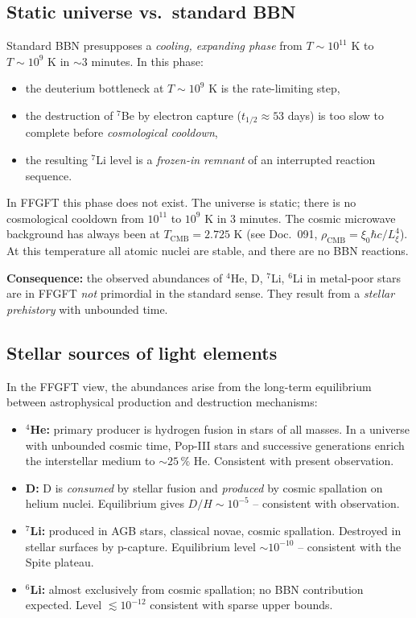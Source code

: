 \subsection{Static universe vs.\ standard BBN}

Standard BBN presupposes a \emph{cooling, expanding phase} from
$T \sim 10^{11}$ K to $T \sim 10^{9}$ K in $\sim 3$ minutes. In this
phase:
\begin{itemize}[leftmargin=2em,itemsep=2pt,topsep=2pt]
  \item the deuterium bottleneck at $T \sim 10^{9}$ K is the
        rate-limiting step,
  \item the destruction of $^7$Be by electron capture
        ($t_{1/2} \approx 53$ days) is too slow to complete before
        \emph{cosmological cooldown},
  \item the resulting $^7$Li level is a \emph{frozen-in remnant} of
        an interrupted reaction sequence.
\end{itemize}

In FFGFT this phase does not exist. The universe is static; there is
no cosmological cooldown from $10^{11}$ to $10^{9}$ K in 3 minutes.
The cosmic microwave background has always been at $T_\text{CMB} =
2.725$ K (see Doc.~091, $\rho_\text{CMB} = \xi_0 \hbar c / L_\xi^4$).
At this temperature all atomic nuclei are stable, and there are no
BBN reactions.

\textbf{Consequence:} the observed abundances of $^4$He, D, $^7$Li,
$^6$Li in metal-poor stars are in FFGFT \emph{not} primordial in the
standard sense. They result from a \emph{stellar prehistory} with
unbounded time.

\subsection{Stellar sources of light elements}

In the FFGFT view, the abundances arise from the long-term
equilibrium between astrophysical production and destruction
mechanisms:

\begin{itemize}[leftmargin=2em,itemsep=2pt,topsep=2pt]
  \item \textbf{$^4$He:} primary producer is hydrogen fusion in stars
        of all masses. In a universe with unbounded cosmic time,
        Pop-III stars and successive generations enrich the
        interstellar medium to $\sim 25\,\%$ He. Consistent with
        present observation.
  \item \textbf{D:} D is \emph{consumed} by stellar fusion and
        \emph{produced} by cosmic spallation on helium nuclei.
        Equilibrium gives $D/H \sim 10^{-5}$ -- consistent with
        observation.
  \item \textbf{$^7$Li:} produced in AGB stars, classical novae,
        cosmic spallation. Destroyed in stellar surfaces by
        p-capture. Equilibrium level $\sim 10^{-10}$ -- consistent
        with the Spite plateau.
  \item \textbf{$^6$Li:} almost exclusively from cosmic spallation;
        no BBN contribution expected. Level $\lesssim 10^{-12}$
        consistent with sparse upper bounds.
\end{itemize}

